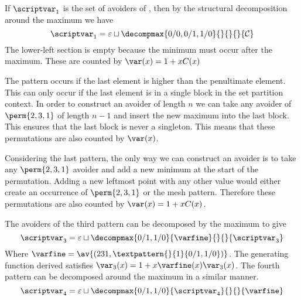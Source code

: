 If \(\scriptvar_1\) is the set of avoiders of
, then by the structural
decomposition around the maximum we have
\begin{equation*}
    \scriptvar_1 = \varepsilon \sqcup
    \decompmax{0/0,0/1,1/0}{}{}{}{\mathcal{C}}
\end{equation*}
The lower-left section is empty because the minimum must occur after the maximum.
These are counted by \(\var(x) = 1+xC(x)\)

The pattern  occurs if
the last element is higher than the penultimate element. This can only occur
if the last element is in a single block in the set partition context. In order
to construct an avoider of length \(n\) we can take any avoider of
\(\perm{2,3,1}\) of length \(n-1\) and insert the new maximum into the last
block.  This ensures that the last block is never a singleton. This means
that these permutations are also counted by \(\var(x)\).

Considering the last pattern, the only way we can construct an
avoider is to take any \(\perm{2,3,1}\) avoider and add a new minimum
at the start of the permutation. Adding a new leftmost point with any other
value would either create an occurrence of \(\perm{2,3,1}\) or the mesh pattern.
Therefore these permutations are also counted by \(\var(x) = 1+xC(x)\).

The avoiders of the third pattern can be decomposed by the maximum
to give
\begin{equation*}
    \scriptvar_3 = \varepsilon \sqcup
    \decompmax{0/1,1/0}{\mathcal{\varfine}}{}{}{\scriptvar_3}
\end{equation*}
Where \(\mathcal{\varfine} = \av{(231,\textpattern{}{1}{0/1,1/0})}\).
The generating function derived satisfies \(\var_3(x) = 1 + x\varfine(x)\var_3(x)\).
The fourth pattern can be decomposed around the maximum in a similar
manner.
\begin{equation*}
    \scriptvar_4 = \varepsilon \sqcup
    \decompmax{0/1,1/0}{\scriptvar_4}{}{}{\mathcal{\varfine}}
\end{equation*}

